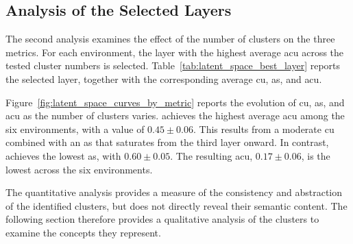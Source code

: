 \subsection{Analysis of the Selected Layers}

The second analysis examines the effect of the number of clusters on the three metrics.
For each environment, the layer with the highest average \gls{acu} across the tested cluster numbers is selected.
Table~\ref{tab:latent_space_best_layer} reports the selected layer, together with the corresponding average \gls{cu}, \gls{as}, and \gls{acu}.



Figure~\ref{fig:latent_space_curves_by_metric} reports the evolution of \gls{cu}, \gls{as}, and \gls{acu} as the number of clusters varies.
\PongName achieves the highest average \gls{acu} among the six environments, with a value of $0.45 \pm 0.06$.
This results from a moderate \gls{cu} combined with an \gls{as} that saturates from the third layer onward.
In contrast, \MsPacManName achieves the lowest \gls{as}, with $0.60 \pm 0.05$.
The resulting \gls{acu}, $0.17 \pm 0.06$, is the lowest across the six environments.



The quantitative analysis provides a measure of the consistency and abstraction of the identified clusters, but does not directly reveal their semantic content.
The following section therefore provides a qualitative analysis of the clusters to examine the concepts they represent.